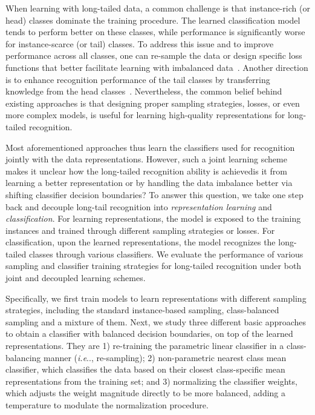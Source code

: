 \documentclass[dvipsnames]{article} \usepackage{iclr2020_conference, times}
\makeatletter
\DeclareRobustCommand\onedot{\futurelet\@let@token\@onedot}
\def\@onedot{\ifx\@let@token.\else.\null\fi\xspace}
\def\ie{\emph{i.e}\onedot} \def\Ie{\emph{I.e}\onedot}
\makeatother
\begin{document}
When learning with long-tailed data, a common challenge is that instance-rich (or head) classes dominate the training procedure. The learned classification model tends to perform better on these classes, while  {performance}  {is significantly worse} for instance-scarce (or tail) classes. To address this issue {and} to improve performance across all classes, one can re-sample the data or design specific loss functions that better facilitate learning with imbalanced data~\citep{chawla2002smote, cui2019class, cao2019learning}. Another direction is to enhance recognition performance of the tail classes  by transferring knowledge from the head classes~\citep{wang2017learning, Wang_2018_CVPR,Zhong_2019_CVPR,liu2019large}.  Nevertheless, the common belief behind existing approaches is that designing proper sampling strategies, losses, or even more complex models, is useful for learning high-quality representations for long-tailed recognition. 

Most aforementioned approaches thus learn the classifiers used for recognition jointly with the data representations. However, such a joint learning scheme makes it unclear how the long-tailed recognition ability is  {achieved}\textemdash is it from learning a better representation  {or by}  handling the data imbalance  better {via shifting classifier decision boundaries}? To answer this question,  we take one step back and  decouple long-tail recognition into \emph{representation learning} and \emph{classification}. For learning representations, the model is exposed to the training instances and trained through different sampling strategies or losses. For classification, upon the learned representations, the model recognizes  the long-tailed  classes through various classifiers. {We evaluate the performance of various sampling and classifier training strategies for long-tailed recognition under both joint and decoupled learning schemes.}

Specifically, we first train models to learn representations with different sampling strategies, including the standard instance-based sampling, class-balanced sampling and a mixture of them.  Next, we study three different  {basic} approaches to obtain a classifier with balanced decision boundaries, on top of the learned representations. They are  1) re-training the parametric linear classifier in a class-balancing manner (\ie, re-sampling); 2) non-parametric nearest class mean classifier, which classifies the data based on their closest  class-specific  mean representations from the training set; and 3) normalizing the classifier weights, which adjusts the weight magnitude directly to be more balanced,  adding a temperature to modulate the normalization procedure.
\end{document}
